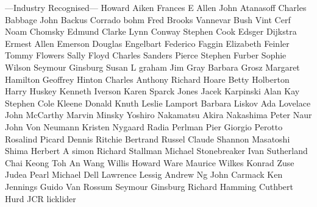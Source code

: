 \documentclass[12pt,a4paper]{article}
\begin{document}
\begin{appendices}
 
 ---Industry Recognised---
 Howard Aiken  
 Frances E Allen 
 John Atanasoff 
 Charles Babbage
 John Backus
 Corrado bohm
 Fred Brooks
 Vannevar Bush
 Vint Cerf
 Noam Chomsky
 Edmund Clarke
 Lynn Conway 
 Stephen Cook
 Edsger Dijkstra 
 Ermest Allen Emerson 
 Douglas Engelbart
 Federico Faggin
 Elizabeth Feinler
 Tommy Flowers
 Sally Floyd
 Charles Sanders Pierce
 Stephen Furber
 Sophie Wilson
 Seymour Ginsburg
 Susan L graham
 Jim Gray
 Barbara Grosz
 Margaret Hamilton
 Geoffrey Hinton
 Charles Anthony Richard Hoare 
 Betty Holberton
 Harry Huskey
 Kenneth Iverson
 Karen Sparck Jones
 Jacek Karpinski 
 Alan Kay
 Stephen Cole Kleene
 Donald Knuth
 Leslie Lamport
 Barbara Liskov
 Ada Lovelace
 John McCarthy
 Marvin Minsky
 Yoshiro Nakamatsu
 Akira Nakashima
 Peter Naur
 John Von Neumann
 Kristen Nygaard
 Radia Perlman
 Pier Giorgio Perotto
 Rosalind Picard
 Dennis Ritchie
 Bertrand Russel
 Claude Shannon 
 Masatoshi Shima
 Herbert A simon
 Richard Stallman
 Michael Stonebreaker
 Ivan Sutherland 
 Chai Keong Toh
 An Wang
 Willis Howard Ware
 Maurice Wilkes 
 Konrad Zuse
 Judea Pearl
 Michael Dell
 Lawrence Lessig
 Andrew Ng
 John Carmack
 Ken Jennings
 Guido Van Rossum
 Seymour Ginsburg 
 Richard Hamming
 Cuthbert Hurd
 JCR licklider
\end{appendices}
\end{document}
